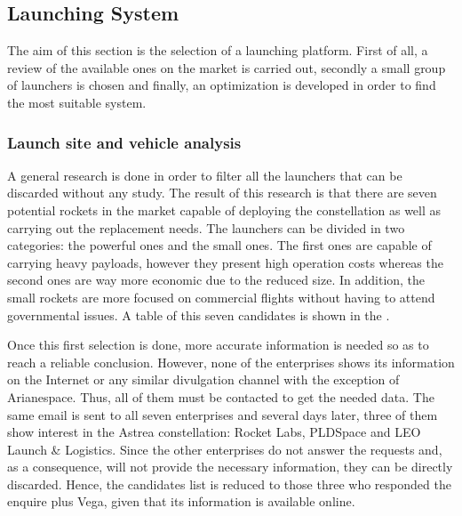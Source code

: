 \subsection{Launching System}
The aim of this section is the selection of a launching platform. First of all, a review of the available ones on the market is carried out, secondly a small group of launchers is chosen and finally, an optimization is developed in order to find the most suitable system. 

\subsubsection{Launch site and vehicle analysis}
A general research is done in order to filter all the launchers that can be discarded without any study. The result of this research is that there are seven potential rockets in the market capable of deploying the constellation as well as carrying out the replacement needs. The launchers can be divided in two categories: the powerful ones and the small ones. The first ones are capable of carrying heavy payloads, however they present high operation costs whereas the second ones are way more economic due to the reduced size. In addition, the small rockets are more focused on commercial flights without having to attend governmental issues. A table of this seven candidates is shown in the \cite[Chapter 1, Section 1]{annex2}.

Once this first selection is done, more accurate information is needed so as to reach a reliable conclusion. However, none of the enterprises shows its information on the Internet or any similar divulgation channel with the exception of Arianespace. Thus, all of them must be contacted to get the needed data. The same email is sent to all seven enterprises and several days later, three of them show interest in the Astrea constellation: Rocket Labs, PLDSpace and LEO Launch \& Logistics. Since the other enterprises do not answer the requests and, as a consequence, will not provide the necessary information, they can be directly discarded. Hence, the candidates list is reduced to those three who responded the enquire plus Vega, given that its information is available online. 

